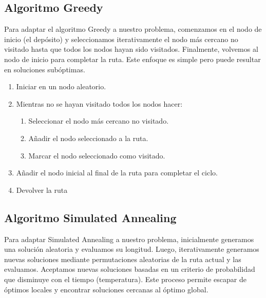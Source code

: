 \documentclass[11pt,a4paper,spanish]{book}
\begin{document}
\subsection{Algoritmo Greedy}

Para adaptar el algoritmo Greedy a nuestro problema, comenzamos en el nodo de inicio (el depósito) y seleccionamos iterativamente el nodo más cercano no visitado hasta que todos los nodos hayan sido visitados. Finalmente, volvemos al nodo de inicio para completar la ruta. Este enfoque es simple pero puede resultar en soluciones subóptimas.

\begin{tcolorbox}[colback=white!95!blue, colframe=blue!50!black, title=Algoritmo Greedy, fontupper=\ttfamily]
\begin{spacing}{0.9}
\begin{enumerate}
    \item Iniciar en un nodo aleatorio.
    \item Mientras no se hayan visitado todos los nodos hacer:
    \begin{enumerate}
        \item Seleccionar el nodo más cercano no visitado.
        \item Añadir el nodo seleccionado a la ruta.
        \item Marcar el nodo seleccionado como visitado.
    \end{enumerate}
    \item Añadir el nodo inicial al final de la ruta para completar el ciclo.
    \item Devolver la ruta
\end{enumerate}
\end{spacing}
\end{tcolorbox}


\subsection{Algoritmo Simulated Annealing}

Para adaptar Simulated Annealing a nuestro problema, inicialmente generamos una solución aleatoria y evaluamos su longitud. Luego, iterativamente generamos nuevas soluciones mediante permutaciones aleatorias de la ruta actual y las evaluamos. Aceptamos nuevas soluciones basadas en un criterio de probabilidad que disminuye con el tiempo (temperatura). Este proceso permite escapar de óptimos locales y encontrar soluciones cercanas al óptimo global.
\end{document}
